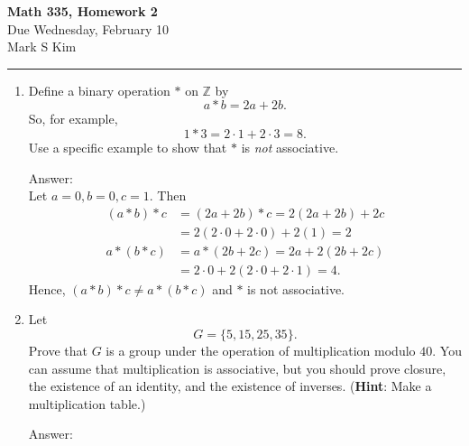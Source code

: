 \documentclass[11pt,twoside]{article}
\begin{document}
\begin{center}
{\bf \Large Math 335, Homework 2}\\
\vspace{0.1in}
{\Large Due Wednesday, February 10}\\
\vspace{0.2cm}
{\large Mark S Kim}
\vspace{0.1cm}
\end{center}

\hrule

\vspace{.2in}

\begin{enumerate}

\item Define a binary operation $\ast$ on $\mathbb{Z}$ by
\[a \ast b = 2a + 2b.\]
So, for example,
\[1 \ast 3 = 2 \cdot 1 + 2 \cdot 3 = 8.\]
Use a specific example to show that $\ast$ is {\it not} associative.

{\color{red}Answer:}\\
Let $a=0, b=0, c=1$.  Then
\begin{align*}
(a \ast b) \ast c &= (2a + 2b) \ast c = 2(2a + 2b) + 2c\\
&= 2(2\cdot 0 + 2\cdot 0) + 2(1) = 2\\
a \ast (b \ast c) &= a \ast (2b + 2c) = 2a + 2(2b + 2c)\\
&= 2\cdot 0 + 2(2\cdot 0 + 2\cdot 1) = 4.
\end{align*}
Hence, $(a \ast b) \ast c \neq a \ast (b \ast c)$ and $\ast$ is not associative.

\vspace{0.5cm}


\item Let
\[G = \{5,15,25,35\}.\]
Prove that $G$ is a group under the operation of multiplication modulo $40$.  You can assume that multiplication is associative, but you should prove closure, the existence of an identity, and the existence of inverses.  ({\bf Hint}: Make a multiplication table.)

{\color{red}Answer:}


\end{enumerate}
\end{document}
